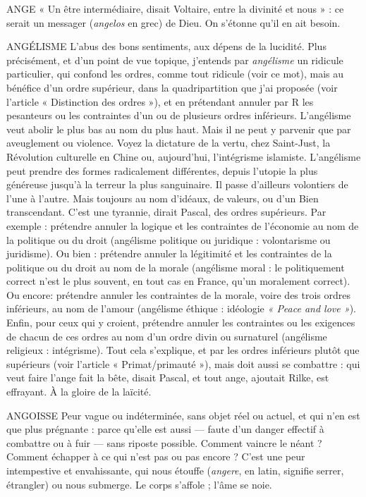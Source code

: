 ANGE  « Un être intermédiaire, disait Voltaire, entre la divinité et nous » : ce
serait un messager ({\it angelos} en grec) de Dieu. On s'étonne qu'il en ait
besoin.

ANGÉLISME L'abus des bons sentiments, aux dépens de la lucidité. Plus précisément,
et d’un point de vue topique, j'entends par {\it angélisme}
un ridicule particulier, qui confond les ordres, comme tout ridicule (voir ce
mot), mais au bénéfice d’un ordre supérieur, dans la quadripartition que j'ai
proposée (voir l’article « Distinction des ordres »), et en prétendant annuler par
R les pesanteurs ou les contraintes d’un ou de plusieurs ordres inférieurs.
L’angélisme veut abolir le plus bas au nom du plus haut. Mais il ne peut y parvenir
que par aveuglement ou violence. Voyez la dictature de la vertu, chez
Saint-Just, la Révolution culturelle en Chine ou, aujourd’hui, l’intégrisme islamiste.
L’angélisme peut prendre des formes radicalement différentes, depuis
l'utopie la plus généreuse jusqu’à la terreur la plus sanguinaire. Il passe
d’ailleurs volontiers de l’une à l’autre. Mais toujours au nom d’idéaux, de
valeurs, ou d’un Bien transcendant. C’est une tyrannie, dirait Pascal, des ordres
supérieurs. Par exemple : prétendre annuler la logique et les contraintes de
l’économie au nom de la politique ou du droit (angélisme politique ou
juridique : volontarisme ou juridisme). Ou bien : prétendre annuler la légitimité
et les contraintes de la politique ou du droit au nom de la morale (angélisme
moral : le politiquement correct n’est le plus souvent, en tout cas en
France, qu'un moralement correct). Ou encore: prétendre annuler les
contraintes de la morale, voire des trois ordres inférieurs, au nom de l'amour
(angélisme éthique : idéologie {\it « Peace and love »}). Enfin, pour ceux qui y
croient, prétendre annuler les contraintes ou les exigences de chacun de ces
ordres au nom d’un ordre divin ou surnaturel (angélisme religieux : intégrisme).
Tout cela s'explique, et par les ordres inférieurs plutôt que supérieurs
(voir l’article « Primat/primauté »), mais doit aussi se combattre : qui veut faire
l’ange fait la bête, disait Pascal, et tout ange, ajoutait Rilke, est effrayant. À la
gloire de la laïcité.

ANGOISSE Peur vague ou indéterminée, sans objet réel ou actuel, et qui n’en
est que plus prégnante : parce qu’elle est aussi — faute d’un
danger effectif à combattre ou à fuir — sans riposte possible. Comment vaincre
le néant ? Comment échapper à ce qui n’est pas ou pas encore ? C’est une peur
intempestive et envahissante, qui nous étouffe ({\it angere}, en latin, signifie serrer,
étrangler) ou nous submerge. Le corps s’affole ; l’âme se noie.

